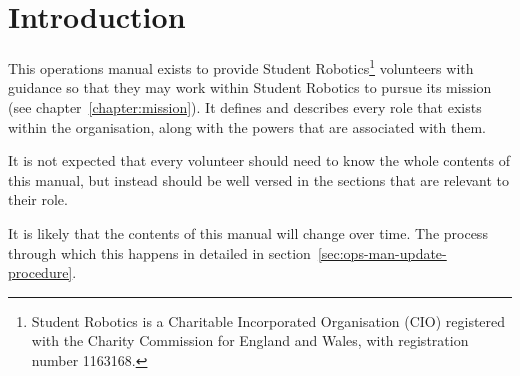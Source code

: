 \chapter{Introduction}

This operations manual exists to provide Student Robotics\footnote{Student Robotics is a Charitable Incorporated Organisation (CIO) registered with the Charity Commission for England and Wales, with registration number 1163168.} volunteers with guidance so that they may work within Student Robotics to pursue its mission (see chapter~\ref{chapter:mission}).  It defines and describes every role that exists within the organisation, along with the powers that are associated with them.

It is not expected that every volunteer should need to know the whole contents of this manual, but instead should be well versed in the sections that are relevant to their role.

It is likely that the contents of this manual will change over time.  The process through which this happens in detailed in section~\ref{sec:ops-man-update-procedure}.

